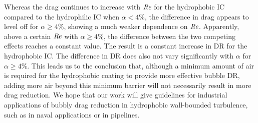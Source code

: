 Whereas the drag continues to increase with $\mbox{\textit{Re}}$ for the {hydrophobic} IC compared to the hydrophilic IC when $\alpha < 4\%$, the difference in drag appears to level off for $\alpha \geq 4\%$, showing a much weaker dependence on $\mbox{\textit{Re}}$. Apparently, above a certain $\mbox{\textit{Re}}$ with $\alpha \geq 4\%$, the difference between the two competing effects reaches a constant value. The result is a constant increase in DR for the {hydrophobic} IC. The difference in DR does also not vary significantly with $\alpha$ for $\alpha \geq 4\%$. This leads us to the conclusion that, although a minimum amount of air is required for the {hydrophobic} coating to provide more effective bubble DR, adding more air beyond this minimum barrier will not necessarily result in more drag reduction. We hope that our work will give guidelines for industrial applications of bubbly drag reduction in hydrophobic wall-bounded turbulence, such as in naval applications or in pipelines.
